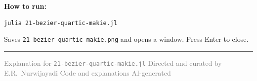 \documentclass[12pt, a4paper]{article}
\newcommand{\cd}[1]{\texttt{#1}}
\begin{document}
\begin{notebox}
\textbf{How to run:}
\begin{verbatim}
julia 21-bezier-quartic-makie.jl
\end{verbatim}
Saves \cd{21-bezier-quartic-makie.png} and opens a window.
Press Enter to close.
\end{notebox}

\vspace{2em}\hrule\vspace{0.5em}
{\small\textcolor{gray}{%
Explanation for \texttt{21-bezier-quartic-makie.jl}
\textbar{} Directed and curated by E.R.\ Nurwijayadi
\textbar{} Code and explanations AI-generated}}
\end{document}
